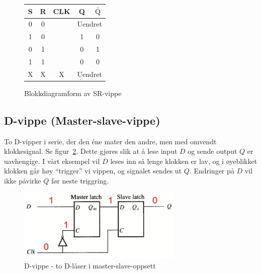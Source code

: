 \documentclass[12pt,a4paper,norsk]{article}
\newcommand{\red}[1]{{\color{red}#1}}
\newcommand{\rising}{\texttiming{[-,timing/slope=0]LH}}
\begin{document}
\begin{figure}[hbt!]
  \centering
  \begin{minipage}{.45\textwidth}
    \centering
    \caption{Blokkdiagramform av SR-vippe\label{fig:SR-flip-flop-block}}
  \end{minipage}\hfill
  \begin{minipage}{.45\textwidth}
    \centering
    \begin{tabular}{ccc|cc}
      \toprule
      S & R & CLK & Q & $\bar{\text{Q}}$ \\
      \midrule
      0 & 0 & \rising{} & \multicolumn{2}{c}{Uendret} \\
      1 & 0 & \rising{} & 1 & 0 \\
      0 & 1 & \rising{} & 0 & 1 \\
      1 & 1 & \rising{} & \red{0} & \red{0} \\
      X & X & X & \multicolumn{2}{c}{Uendret} \\
      \bottomrule
    \end{tabular}
  \end{minipage}
\end{figure}

\subsection{D-vippe (Master-slave-vippe)}
To D-vipper i serie, der den éne mater den andre, men med omvendt klokkesignal. Se
figur~\ref{fig:master_slave}. Dette gjøres slik at å lese input $D$ og sende
output $Q$ er uavhengige. I vårt eksempel vil $D$ leses inn så lenge
klokken er lav, og i øyeblikket klokken går høy ``trigger'' vi vippen, og
signalet sendes ut $Q$. Endringer på $D$ vil ikke påvirke $Q$ før
neste triggring.

\begin{figure}[hbt!]
  \centering
  \includegraphics[width=0.7\textwidth,height=\textheight,keepaspectratio]{Krets_MasterSlave}
  \caption{D-vippe - to D-låser i master-slave-oppsett\label{fig:master_slave}}
\end{figure}
\end{document}
